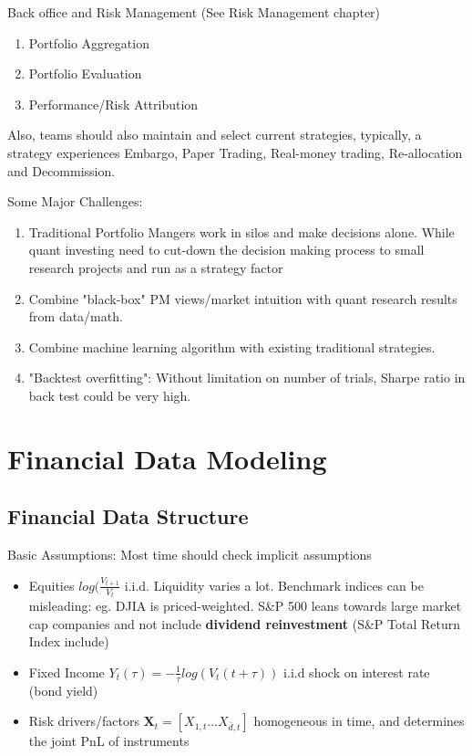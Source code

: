 \documentclass[11pt, openany]{book}              %
\begin{document}
Back office and Risk Management (See Risk Management chapter)

\begin{enumerate}
 \item Portfolio Aggregation
 \item Portfolio Evaluation
 \item Performance/Risk Attribution
\end{enumerate}

Also, teams should also maintain and select current strategies, typically, a strategy experiences Embargo, Paper Trading, Real-money trading, Re-allocation and Decommission.

Some Major Challenges:

\begin{enumerate}
 \item Traditional Portfolio Mangers work in silos and make decisions alone. While quant investing need to cut-down the decision making process to small research projects and run as a strategy factor
 \item Combine "black-box" PM views/market intuition with quant research results from data/math. 
 \item Combine machine learning algorithm with existing traditional strategies. 	
 \item "Backtest overfitting": Without limitation on number of trials, Sharpe ratio in back test could be very high. 
\end{enumerate}


\chapter{Financial Data Modeling}

\section{Financial Data Structure}

Basic Assumptions: Most time should check implicit assumptions

\begin{itemize}
\item Equities $log(\frac{V_{t+1}}{V_t}$ i.i.d. Liquidity varies a lot. Benchmark indices can be misleading: eg. DJIA is priced-weighted. S\&P 500 leans towards large market cap companies and not include \textbf{dividend reinvestment} (S\&P Total Return Index include)
\item Fixed Income $Y_t(\tau) = -\frac{1}{\tau} log(V_t(t+\tau))$ i.i.d shock on interest rate (bond yield)
\item Risk drivers/factors $\mathbf{X}_t = [X_{1,t}...X_{\bar{d},t}]$ homogeneous in time, and determines the joint PnL of instruments

\end{itemize}
\end{document}
